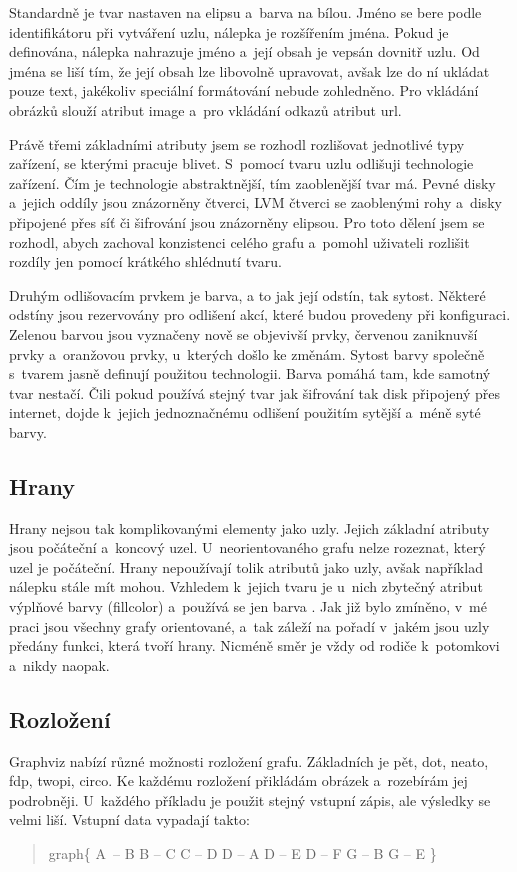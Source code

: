 \documentclass[color,table,oneside,nolot,nolof]{fithesis}
\begin{document}
	Standardně je tvar nastaven na elipsu a~barva
	na bílou. Jméno se bere podle identifikátoru při vytváření uzlu, nálepka je rozšířením jména. Pokud je definována, nálepka nahrazuje jméno a~její obsah je vepsán dovnitř uzlu. Od jména se liší 
	tím, že její obsah lze libovolně upravovat, avšak lze do ní ukládat pouze text, jakékoliv speciální formátování nebude zohledněno. Pro vkládání obrázků slouží atribut image a~pro vkládání
	odkazů atribut url.

	Právě třemi základními atributy jsem se rozhodl rozlišovat jednotlivé typy zařízení, se kterými pracuje blivet. S~pomocí tvaru uzlu odlišuji technologie zařízení. Čím je technologie
	abstraktnější, tím zaoblenější tvar má. Pevné disky a~jejich oddíly jsou znázorněny čtverci, LVM čtverci se zaoblenými rohy a~disky připojené přes síť či šifrování jsou znázorněny elipsou.
	Pro toto dělení jsem se rozhodl, abych zachoval konzistenci celého grafu a~pomohl uživateli rozlišit rozdíly jen pomocí krátkého shlédnutí tvaru.

	Druhým odlišovacím prvkem je barva, a to jak její odstín, tak sytost. Některé odstíny jsou rezervovány pro odlišení akcí, které budou provedeny při konfiguraci. Zelenou barvou jsou vyznačeny
	nově se objevivší prvky, červenou zaniknuvší prvky a~oranžovou prvky, u~kterých došlo ke změnám. Sytost barvy společně s~tvarem jasně definují použitou technologii. Barva pomáhá tam, kde
	samotný tvar nestačí. Čili pokud používá stejný tvar jak šifrování tak disk připojený přes internet, dojde k~jejich jednoznačnému odlišení použitím sytější a~méně syté barvy.

\subsection{Hrany}
	Hrany nejsou tak komplikovanými elementy jako uzly. Jejich základní atributy jsou počáteční a~koncový uzel. U~neorientovaného grafu nelze rozeznat, který uzel je počáteční. Hrany 
	nepoužívají tolik atributů jako uzly, avšak například nálepku stále mít mohou. Vzhledem k~jejich tvaru je u~nich zbytečný atribut výplňové barvy (fillcolor) a~používá se jen barva 
	.
	Jak již bylo zmíněno, v~mé praci jsou všechny grafy orientované, a~tak záleží na pořadí v~jakém jsou uzly předány funkci, která tvoří hrany. Nicméně směr je vždy od rodiče k~potomkovi
	a~nikdy naopak.
	
\subsection{Rozložení}
	Graphviz nabízí různé možnosti rozložení grafu. Základních je pět, dot, neato, fdp, twopi, circo. Ke každému rozložení přikládám obrázek a~rozebírám jej 
	podrobněji. U~každého příkladu je použit stejný vstupní zápis, ale výsledky se velmi liší. Vstupní data vypadají takto:
	\begin{quotation}
	graph\{
		A~-- B
		B -- C
		C -- D
		D -- A
		D -- E
		D -- F
		G -- B
		G -- E
	\}
	\end{quotation}
\end{document}
